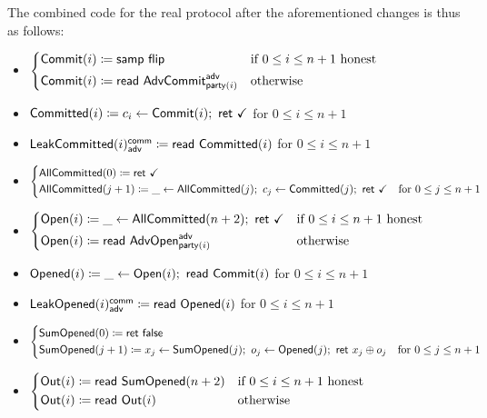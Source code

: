 \noindent The combined code for the real protocol after the aforementioned changes is thus as follows:

\begin{itemize}
\item {\color{blue} $\begin{cases*} \Commit(i) \coloneqq \samp{\flip} & \text{if $0 \leq i \leq n+1$ honest} \\ \Commit(i) \coloneqq \read{\AdvCommit^\adv_{\party(i)}} & \text{otherwise} \end{cases*}$}
\item {\color{magenta} $\mathsf{Committed}(i) \coloneqq c_i \leftarrow \mathsf{Commit}(i); \ \mathsf{ret} \ \checkmark$ for $0 \leq i \leq n+1$}
\item {\color{magenta} $\mathsf{LeakCommitted}(i)^{\mathsf{comm}}_{\mathsf{adv}} \coloneqq \mathsf{read} \ \mathsf{Committed}(i)$ for $0 \leq i \leq n+1$}
\item {\color{magenta} $\begin{cases*} \AllCommitted(0) \coloneqq \ret{\checkmark} & \\ \AllCommitted(j+1) \coloneqq \_ \leftarrow \AllCommitted(j); \ c_j \leftarrow \Committed(j); \ \ret{\checkmark} & \text{for $0 \leq j \leq n+1$} \end{cases*}$}
\item {\color{teal} $\begin{cases*} \Open(i) \coloneqq \_ \leftarrow \AllCommitted(n+2); \ \ret{\checkmark} & \text{if $0 \leq i \leq n+1$ honest} \\ \Open(i) \coloneqq \read{\AdvOpen^\adv_{\party(i)}} & \text{otherwise} \end{cases*}$}
\item {\color{red} $\mathsf{Opened}(i) \coloneqq \_ \leftarrow \mathsf{Open}(i); \ \mathsf{read} \ \mathsf{Commit}(i)$ for $0 \leq i \leq n+1$}
\item {\color{red} $\mathsf{LeakOpened}(i)^{\mathsf{comm}}_{\mathsf{adv}} \coloneqq \mathsf{read} \ \mathsf{Opened}(i)$ for $0 \leq i \leq n+1$}
\item {\color{red} $\begin{cases*} \SumOpened(0) \coloneqq \ret{\false} & \\ \SumOpened(j+1) \coloneqq x_j \leftarrow \SumOpened(j); \ o_j \leftarrow \Opened(j); \ \ret{x_j \oplus o_j} & \text{for $0 \leq j \leq n+1$} \end{cases*}$}
\item $\begin{cases*} \Out(i) \coloneqq \read{\SumOpened(n+2)} & \text{if $0 \leq i \leq n+1$ honest} \\ \Out(i) \coloneqq \read{\Out(i)} & \text{otherwise} \end{cases*}$
\end{itemize}

